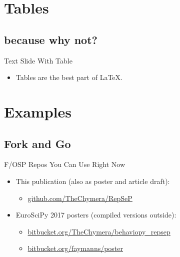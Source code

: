 	\section{Tables}
		\subsection{because why not?}
			\begin{frame}{Text Slide With Table}
				\begin{itemize}
					\item Tables are the best part of \LaTeX.
				\end{itemize}
				\begin{table}[]
					\vspace{0.4em}
					\vspace{0.4em}
				\end{table}
			\end{frame}
	\section{Examples}
		\subsection{Fork and Go}
			\begin{frame}{F/OSP Repos You Can Use Right Now}
				\begin{itemize}
					\item This publication (also as poster and article draft):
						\begin{itemize}
							\item \href{https://github.com/TheChymera/RepSeP}{github.com/TheChymera/RepSeP}
						\end{itemize}
					\item EuroSciPy 2017 posters (compiled versions outside):
						\begin{itemize}
							\item \href{https://bitbucket.org/TheChymera/behaviopy\_repsep/}{bitbucket.org/TheChymera/behaviopy\_repsep}
							\item \href{https://bitbucket.org/faymanns/poster}{bitbucket.org/faymanns/poster}
						\end{itemize}
				\end{itemize}
			\end{frame}

